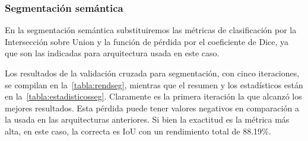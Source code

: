 \subsubsection{Segmentación semántica}

En la segmentación semántica substituiremos las métricas de clasificación por la
Intersección sobre Union y la función de pérdida por el coeficiente de Dice, ya
que son las indicadas para arquitectura usada en este caso.

Los resultados de la validación cruzada para segmentación, con cinco
iteraciones, se compilan en la~\autoref{tabla:rendseg}, mientras que el resumen
y los estadísticos están en la~\autoref{tabla:estadisticosseg}. Claramente es la
primera iteración la que alcanzó los mejores resultados. Esta pérdida puede
tener valores negativos en comparación a la usada en las arquitecturas
anteriores. Si bien la exactitud es la métrica más alta, en este caso, la
correcta es IoU con un rendimiento total de 88.19\%.

\begin{table}[H]
    \centering
    \caption{Rendimiento de la validación cruzada de segmentación}\label{tabla:rendseg}
    \end{table}

\begin{table}[H]
    \centering
    \caption{Estadísticos del experimento}\label{tabla:estadisticosseg}
    \end{table}

